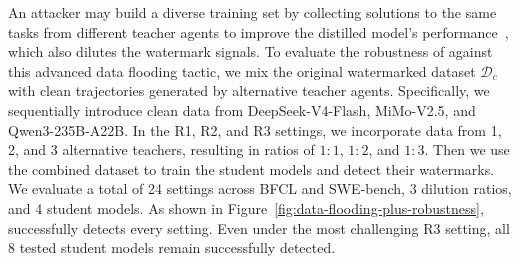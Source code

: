  An attacker may build a diverse training set by collecting solutions to the same tasks from different teacher agents to improve the distilled model's performance~\cite{cui2023ultrafeedback, luo2026agentark}, which also dilutes the watermark signals. To evaluate the robustness of \name{} against this advanced data flooding tactic, we mix the original watermarked dataset $\mathcal{D}_c$ with clean trajectories generated by alternative teacher agents. Specifically, we sequentially introduce clean data from DeepSeek-V4-Flash, MiMo-V2.5, and Qwen3-235B-A22B. In the R1, R2, and R3 settings, we incorporate data from 1, 2, and 3 alternative teachers, resulting in ratios of $1{:}1$, $1{:}2$, and $1{:}3$. Then we use the combined dataset to train the student models and detect their watermarks. We evaluate a total of 24 settings across BFCL and SWE-bench, 3 dilution ratios, and 4 student models. As shown in Figure~\ref{fig:data-flooding-plus-robustness}, \name{} successfully detects every setting. Even under the most challenging R3 setting, all 8 tested student models remain successfully detected.



